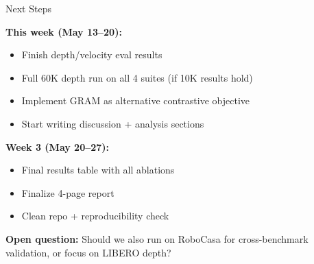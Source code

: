 \documentclass[10pt]{beamer}
\begin{document}
\begin{frame}{Next Steps}

\textbf{This week (May 13--20):}
\begin{itemize}
  \item Finish depth/velocity eval results
  \item Full 60K depth run on all 4 suites (if 10K results hold)
  \item Implement GRAM as alternative contrastive objective
  \item Start writing discussion + analysis sections
\end{itemize}

\vspace{0.8em}

\textbf{Week 3 (May 20--27):}
\begin{itemize}
  \item Final results table with all ablations
  \item Finalize 4-page report
  \item Clean repo + reproducibility check
\end{itemize}

\vspace{0.8em}

\textbf{Open question:} Should we also run on RoboCasa for cross-benchmark validation, or focus on LIBERO depth?

\end{frame}
\end{document}
